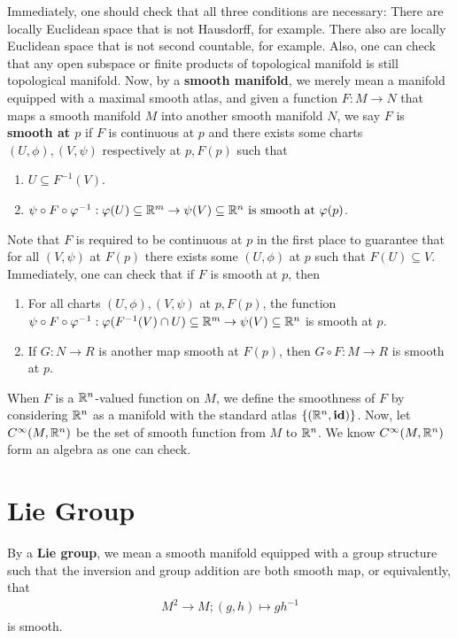 \documentclass{report}
\begin{document}
\begin{mdframed}
Immediately, one should check that all three conditions are necessary: There are locally Euclidean space that is not Hausdorff,  for example. There also are locally Euclidean space that is not second countable,  for example. Also, one can check that any open subspace or finite products of topological manifold is still topological manifold. 
Now, by a \textbf{smooth manifold}, we merely mean a manifold equipped with a maximal smooth atlas, and given a function $F:M\rightarrow N$ that maps a smooth manifold $M$ into another smooth manifold  $N$, we say  $F$ is \textbf{smooth at $p$} if $F$ is continuous at $p$ and there exists some charts $(U,\phi),(V,\psi)$ respectively at $p,F(p)$ such that 
\begin{enumerate}[label=(\roman*)]
  \item $U \subseteq F^{-1}(V)$. 
  \item $\psi \circ F\circ \varphi^{-1} : \varphi (U) \subseteq \mathbb{R}^m \rightarrow \psi (V)\subseteq \mathbb{R}^n\text{  is smooth at }\varphi (p)$. 
\end{enumerate}
Note that $F$ is required to be continuous at $p$ in the first place to guarantee that for all $(V,\psi)$ at $F(p)$ there exists some $(U,\phi)$ at $p$ such that $F(U)\subseteq V$. Immediately, one can check that if $F$ is smooth at  $p$, then 
\begin{enumerate}[label=(\alph*)]
  \item For all charts $(U,\phi),(V,\psi)$ at $p,F(p)$, the function $\psi \circ F\circ \varphi ^{-1}:\varphi(F^{-1}(V)\cap U )\subseteq \mathbb{R}^m\rightarrow \psi  (V )\subseteq \mathbb{R}^n$ is smooth at $p$. 
  \item If $G:N\rightarrow R$ is another map smooth at $F(p)$, then $G\circ F:M\rightarrow R$ is smooth at $p$.  
\end{enumerate}
When $F$ is a $\mathbb{R}^n$-valued function on $M$, we define the smoothness of  $F$ by considering  $\mathbb{R}^n$ as a manifold with the standard atlas  $\{ (\mathbb{R}^n,\textbf{id}) \}$. Now, let $C^{\infty}(M,\mathbb{R}^n)$ be the set of smooth function from $M$ to $\mathbb{R}^n$. We know  $C^{\infty}(M,\mathbb{R}^n)$ form an algebra as one can check.
\end{mdframed}
\section{Lie Group}
\begin{mdframed}
By a \textbf{Lie group}, we mean a smooth manifold equipped with a group structure such that the inversion and group addition are both smooth map, or equivalently, that 
\begin{align*}
M^2\rightarrow  M; (g,h)\mapsto gh^{-1}
\end{align*}
is smooth. 
\end{mdframed}
\end{document}
